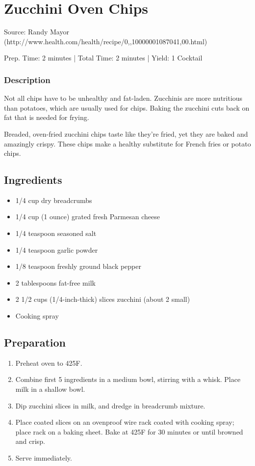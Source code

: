 \section{Zucchini Oven Chips}

Source: Randy Mayor (http://www.health.com/health/recipe/0,,10000001087041,00.html)

\begin{center}
Prep. Time: 2 minutes |
Total Time: 2 minutes | 
Yield: 1 Cocktail
\end{center}

\subsubsection{Description}
Not all chips have to be unhealthy and fat-laden. Zucchinis are more nutritious
than potatoes, which are usually used for chips. Baking the zucchini cuts back
on fat that is needed for frying.

Breaded, oven-fried zucchini chips taste like they're fried, yet they are baked
and amazingly crispy. These chips make a healthy substitute for French fries or
potato chips.

\subsection{Ingredients}
\begin{itemize}
    \item 1/4 cup dry breadcrumbs
    \item 1/4 cup (1 ounce) grated fresh Parmesan cheese
    \item 1/4 teaspoon seasoned salt
    \item 1/4 teaspoon garlic powder
    \item 1/8 teaspoon freshly ground black pepper
    \item 2 tablespoons fat-free milk
    \item 2 1/2 cups (1/4-inch-thick) slices zucchini (about 2 small)
    \item Cooking spray
\end{itemize}

\subsection{Preparation}
\begin{enumerate}
    \item Preheat oven to 425F.
    \item Combine first 5 ingredients in a medium bowl, stirring with a whisk. Place milk in a shallow bowl.
    \item Dip zucchini slices in milk, and dredge in breadcrumb mixture.
    \item Place coated slices on an ovenproof wire rack coated with cooking spray; place rack on a baking sheet. Bake at 425F for 30 minutes or until browned and crisp.
    \item Serve immediately.
\end{enumerate}

